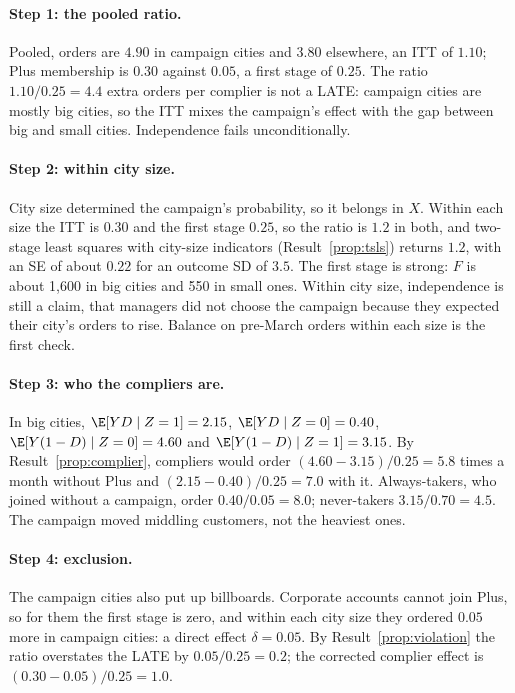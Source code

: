\documentclass[11pt]{article}
\begin{document}
\paragraph{Step 1: the pooled ratio.} Pooled, orders are $4.90$ in campaign cities and $3.80$ elsewhere, an ITT of $1.10$; Plus
membership is $0.30$ against $0.05$, a first stage of $0.25$. The ratio $1.10/0.25 = 4.4$ extra orders per complier is not a
LATE: campaign cities are mostly big cities, so the ITT mixes the campaign's effect with the gap between big and small cities.
Independence fails unconditionally.

\paragraph{Step 2: within city size.} City size determined the campaign's probability, so it belongs in $X$. Within each size
the ITT is $0.30$ and the first stage $0.25$, so the ratio is $1.2$ in both, and two-stage least squares with city-size
indicators (Result~\ref{prop:tsls}) returns $1.2$, with an SE of about $0.22$ for an outcome SD of $3.5$. The first stage is
strong: $F$ is about 1{,}600 in big cities and 550 in small ones. Within city size, independence is still a claim, that managers
did not choose the campaign because they expected their city's orders to rise. Balance on pre-March orders within each size
is the first check.

\paragraph{Step 3: who the compliers are.} In big cities, $\E[YD \mid Z=1] = 2.15$, $\E[YD \mid Z=0] = 0.40$,
$\E[Y(1-D) \mid Z=0] = 4.60$ and $\E[Y(1-D) \mid Z=1] = 3.15$. By Result~\ref{prop:complier}, compliers would order
$(4.60 - 3.15)/0.25 = 5.8$ times a month without Plus and $(2.15 - 0.40)/0.25 = 7.0$ with it. Always-takers, who joined
without a campaign, order $0.40/0.05 = 8.0$; never-takers $3.15/0.70 = 4.5$. The campaign moved middling customers, not the
heaviest ones.

\paragraph{Step 4: exclusion.} The campaign cities also put up billboards. Corporate accounts cannot join Plus, so for them the
first stage is zero, and within each city size they ordered $0.05$ more in campaign cities: a direct effect $\delta = 0.05$.
By Result~\ref{prop:violation} the ratio overstates the LATE by $0.05/0.25 = 0.2$; the corrected complier effect is
$(0.30 - 0.05)/0.25 = 1.0$.
\end{document}
